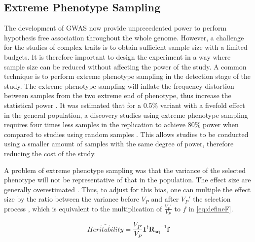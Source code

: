 		\subsection{Extreme Phenotype Sampling}
			The development of \gls{GWAS} now provide unprecedented power to perform hypothesis free association throughout the whole genome.
			However, a challenge for the studies of complex traits is to obtain sufficient sample size with a limited budgets.
			It is therefore important to design the experiment in a way where sample size can be reduced without affecting the power of the study.
			A common technique is to perform extreme phenotype sampling in the detection stage of the study.
			The extreme phenotype sampling will inflate the frequency distortion between samples from the two extreme end of phenotype, thus increase the statistical power \citep{Guey2011}.
			It was estimated that for a 0.5\% variant with a fivefold effect in the general population, a discovery studies using extreme phenotype sampling requires four times less samples in the replication to achieve 80\% power when compared to studies using random samples \citep{Guey2011}.
			This allows studies to be conducted using a smaller amount of samples with the same degree of power, therefore reducing the cost of the study.
			
			A problem of extreme phenotype sampling was that the variance of the selected phenotype will not be representative of that in the population.
			The effect size are generally overestimated \citep{Guey2011}. 
			Thus, to adjust for this bias, one can multiple the effect size by the ratio between the variance before $V_P$ and after $V_{P}'$ the selection process \citep{Sham2014}, which is equivalent to the multiplication of $\frac{V_{P}'}{V_P}$ to $f$ in \cref{eq:defineF}.
			
			\begin{equation}
			\hat{Heritability} = \frac{V_{P'}}{V_P}\boldsymbol{1}^t\boldsymbol{R_{sq}}^{-1}\boldsymbol{f}
			\label{eq:extremeShrek}
			\end{equation}
			
